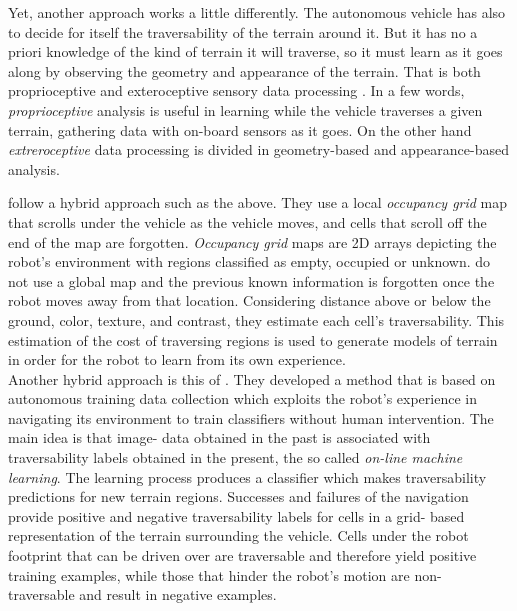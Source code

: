 \documentclass[12pt,a4paper]{report}
\newcommand{\term}{\textit}
\newcommand{\acronym}{\MakeUppercase}
\begin{document}
	Yet, another approach works a little differently. The autonomous 
	vehicle has also to decide for itself the traversability of the terrain 
	around it. But it has no a priori knowledge of the kind of terrain it will 
	traverse, so it must learn as it goes along by observing the geometry and 
	appearance of the terrain. That is both proprioceptive and exteroceptive sensory 
	data processing \citep{Papadakis}. In a few words, \term{proprioceptive} analysis 
	is useful in learning while the vehicle traverses a given terrain, gathering data 
	with on-board sensors as it goes. On the other hand \term{extreroceptive} data 
	processing is divided in geometry-based and appearance-based analysis. 
	\par
	\citet{Shneier} follow a hybrid approach such as the above. They use a local 
	\term{occupancy grid} map that scrolls under the vehicle as the vehicle moves,
	and cells that scroll off the end of the map are forgotten. 
	\term{Occupancy grid} maps \citep{Moravec} are \acronym{2d} arrays depicting the 
	robot’s environment with regions classified as empty, occupied or unknown.
	\citet{Shneier} do not 
	use a global map and the previous known information is forgotten once the robot 
	moves away from that location. Considering distance above or below the ground, 
	color, texture, and contrast, they estimate each cell’s traversability. 
	This estimation of the cost of traversing regions is used to generate models of 
	terrain in order for the robot to learn from its own experience.
	\\
	
	Another hybrid approach is this of \citet{Kim}. They 
	developed a method that is based on autonomous training data collection which 
	exploits the robot’s experience in navigating its environment to train 
	classifiers without human intervention. The main idea is that image-
	data obtained in the past is associated with traversability labels 
	obtained in the present, the so called \term{on-line machine learning}. The 
	learning process produces a classifier which makes traversability 
	predictions for new terrain regions. Successes and failures of the navigation 
	provide positive and negative traversability labels for cells in a grid-
	based representation of the terrain surrounding the vehicle. Cells under the 
	robot footprint that can be driven over are traversable and therefore yield 
	positive training examples, while those that hinder the robot’s motion are non-
	traversable and result in negative examples.
	\\
	
\end{document}
